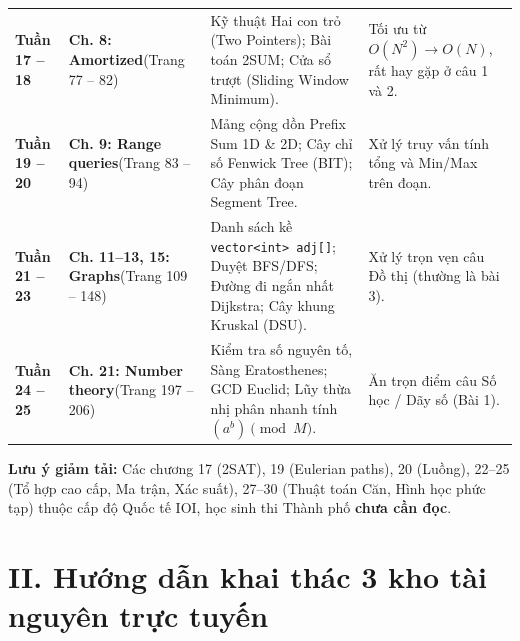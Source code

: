 \documentclass[11pt,a4paper]{article}
\begin{document}
\begin{center}
\begin{tabular}{@{}p{1.8cm}p{3.2cm}p{7.8cm}p{3.8cm}@{}}
\addlinespace[2pt]
\textbf{Tuần 17 -- 18} & \textbf{Ch. 8: Amortized}\newline (Trang 77 -- 82) & Kỹ thuật Hai con trỏ (Two Pointers); Bài toán 2SUM; Cửa sổ trượt (Sliding Window Minimum). & Tối ưu từ $O(N^2) \to O(N)$, rất hay gặp ở câu 1 và 2. \\
\addlinespace[2pt]
\textbf{Tuần 19 -- 20} & \textbf{Ch. 9: Range queries}\newline (Trang 83 -- 94) & Mảng cộng dồn Prefix Sum 1D \& 2D; Cây chỉ số Fenwick Tree (BIT); Cây phân đoạn Segment Tree. & Xử lý truy vấn tính tổng và Min/Max trên đoạn. \\
\addlinespace[2pt]
\textbf{Tuần 21 -- 23} & \textbf{Ch. 11--13, 15: Graphs}\newline (Trang 109 -- 148) & Danh sách kề \texttt{vector<int> adj[]}; Duyệt BFS/DFS; Đường đi ngắn nhất Dijkstra; Cây khung Kruskal (DSU). & Xử lý trọn vẹn câu Đồ thị (thường là bài 3). \\
\addlinespace[2pt]
\textbf{Tuần 24 -- 25} & \textbf{Ch. 21: Number theory}\newline (Trang 197 -- 206) & Kiểm tra số nguyên tố, Sàng Eratosthenes; GCD Euclid; Lũy thừa nhị phân nhanh tính $(a^b) \pmod M$. & Ăn trọn điểm câu Số học / Dãy số (Bài 1). \\ \bottomrule
\end{tabular}
\end{center}

\vspace{-0.1cm}
\noindent
\textbf{\color{orange!85!black}\small * Lưu ý giảm tải:} Các chương 17 (2SAT), 19 (Eulerian paths), 20 (Luồng), 22--25 (Tổ hợp cao cấp, Ma trận, Xác suất), 27--30 (Thuật toán Căn, Hình học phức tạp) thuộc cấp độ Quốc tế IOI, học sinh thi Thành phố \textbf{chưa cần đọc}.

\newpage

\section*{\color{AsianDarkBlue}\large II. Hướng dẫn khai thác 3 kho tài nguyên trực tuyến}
\end{document}
